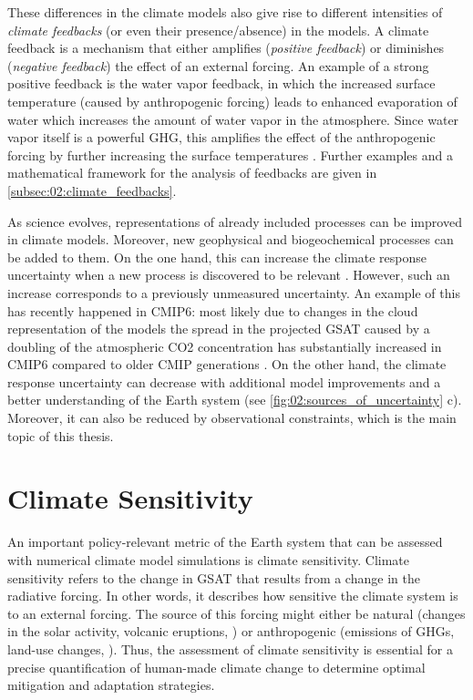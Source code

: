 These differences in the climate models also give rise to different intensities
of \emph{climate feedbacks} (or even their presence/absence) in the models. A
climate feedback is a mechanism that either amplifies (\emph{positive
  feedback}) or diminishes (\emph{negative feedback}) the effect of an external
forcing. An example of a strong positive feedback is the water vapor feedback,
in which the increased surface temperature (caused by anthropogenic forcing)
leads to enhanced evaporation of water which increases the amount of water
vapor in the atmosphere. Since water vapor itself is a powerful \ac{GHG}, this
amplifies the effect of the anthropogenic forcing by further increasing the
surface temperatures \autocite{Cubasch2013}. Further examples and a
mathematical framework for the analysis of feedbacks are given in
\cref{subsec:02:climate_feedbacks}.

As science evolves, representations of already included processes can be
improved in climate models. Moreover, new geophysical and biogeochemical
processes can be added to them. On the one hand, this can increase the climate
response uncertainty when a new process is discovered to be relevant
. However, such an
increase corresponds to a previously unmeasured uncertainty. An example of this
has recently happened in \acs{CMIP}6: most likely due to changes in the cloud
representation of the models the spread in the projected \ac{GSAT} caused by a
doubling of the atmospheric \ac{CO2} concentration has substantially increased
in \acs{CMIP}6 compared to older \ac{CMIP} generations \autocite{Zelinka2020}.
On the other hand, the climate response uncertainty can decrease with
additional model improvements and a better understanding of the Earth system
(see \cref{fig:02:sources_of_uncertainty}{\color{BrownRed} c}). Moreover, it
can also be reduced by observational constraints, which is the main topic of
this thesis.


\section{Climate Sensitivity}
\label{sec:02:climate_sensitivity}

An important policy-relevant metric of the Earth system that can be assessed
with numerical climate model simulations is climate sensitivity. Climate
sensitivity refers to the change in \ac{GSAT} that results from a change in the
radiative forcing. In other words, it describes how sensitive the climate
system is to an external forcing. The source of this forcing might either be
natural (changes in the solar activity, volcanic eruptions, \etc{}) or
anthropogenic (emissions of \acp{GHG}, land-use changes, \etc{}). Thus, the
assessment of climate sensitivity is essential for a precise quantification of
human-made climate change to determine optimal mitigation and adaptation
strategies.


